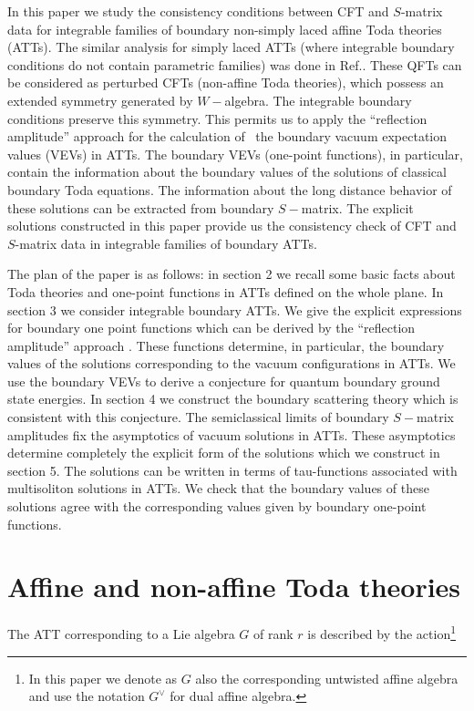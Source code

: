 \documentclass[a4paper,12pt,titlepage,final]{article}
\begin{document}
In this paper we study the consistency conditions between CFT and
$S$-matrix data for integrable families
of boundary non-simply laced affine Toda
theories (ATTs). The similar analysis for simply laced ATTs (where
integrable boundary conditions do not contain parametric families) was done
in Ref.\cite{FO}. These QFTs can be considered as perturbed CFTs
(non-affine Toda theories),
 which possess an extended symmetry generated by
$W-$algebra. The integrable boundary conditions preserve
this symmetry. This
permits us to apply the ``reflection amplitude'' approach \cite{FLZ} for the
calculation of \ the boundary vacuum expectation values (VEVs) in ATTs. The
boundary VEVs (one-point functions), in particular, contain the information
about the boundary values of the solutions of classical boundary Toda
equations. The information about the long distance behavior of these
solutions can be extracted from boundary $S-$matrix. The explicit solutions
constructed in this paper provide us the consistency check of CFT and
$S$-matrix data in integrable families of boundary ATTs.

The plan of the paper is as follows: in section 2 we recall some basic
facts about Toda theories and one-point functions in ATTs defined on
the whole plane. In section 3 we consider integrable boundary ATTs. We
give the explicit expressions for boundary one point functions which
can be derived by the ``reflection amplitude'' approach
\cite{FLZ}. These functions determine, in particular, the boundary
values of the solutions corresponding to the vacuum configurations in
ATTs. We use the boundary VEVs to derive a conjecture for quantum
boundary ground state energies. In section 4 we construct the boundary
scattering theory which is consistent with this conjecture. The
semiclassical limits of boundary $S-$matrix amplitudes fix the
asymptotics of vacuum solutions in ATTs. These asymptotics determine
completely the explicit form of the solutions which we construct in
section 5.  The solutions can be written in terms of tau-functions
associated with multisoliton solutions in ATTs. We check that the
boundary values of these solutions agree with the corresponding
values given by  boundary one-point functions.

\section{ Affine and non-affine Toda theories}

The ATT corresponding to a Lie algebra $G$ of rank $r$ is described by the
action\footnote{In this paper we denote as $G$ also the corresponding
untwisted
affine algebra and use the notation $G^{\vee}$ for dual affine algebra.}
\end{document}
